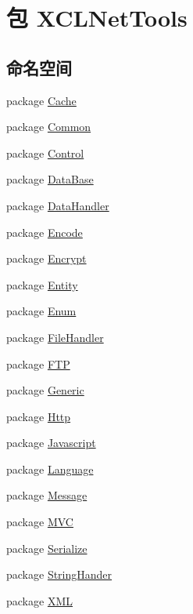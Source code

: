 \hypertarget{namespace_x_c_l_net_tools}{\section{包 X\-C\-L\-Net\-Tools}
\label{namespace_x_c_l_net_tools}
}
\subsection*{命名空间}
\begin{DoxyCompactItemize}
\item 
package \hyperlink{namespace_x_c_l_net_tools_1_1_cache}{Cache}
\item 
package \hyperlink{namespace_x_c_l_net_tools_1_1_common}{Common}
\item 
package \hyperlink{namespace_x_c_l_net_tools_1_1_control}{Control}
\item 
package \hyperlink{namespace_x_c_l_net_tools_1_1_data_base}{Data\-Base}
\item 
package \hyperlink{namespace_x_c_l_net_tools_1_1_data_handler}{Data\-Handler}
\item 
package \hyperlink{namespace_x_c_l_net_tools_1_1_encode}{Encode}
\item 
package \hyperlink{namespace_x_c_l_net_tools_1_1_encrypt}{Encrypt}
\item 
package \hyperlink{namespace_x_c_l_net_tools_1_1_entity}{Entity}
\item 
package \hyperlink{namespace_x_c_l_net_tools_1_1_enum}{Enum}
\item 
package \hyperlink{namespace_x_c_l_net_tools_1_1_file_handler}{File\-Handler}
\item 
package \hyperlink{namespace_x_c_l_net_tools_1_1_f_t_p}{F\-T\-P}
\item 
package \hyperlink{namespace_x_c_l_net_tools_1_1_generic}{Generic}
\item 
package \hyperlink{namespace_x_c_l_net_tools_1_1_http}{Http}
\item 
package \hyperlink{namespace_x_c_l_net_tools_1_1_javascript}{Javascript}
\item 
package \hyperlink{namespace_x_c_l_net_tools_1_1_language}{Language}
\item 
package \hyperlink{namespace_x_c_l_net_tools_1_1_message}{Message}
\item 
package \hyperlink{namespace_x_c_l_net_tools_1_1_m_v_c}{M\-V\-C}
\item 
package \hyperlink{namespace_x_c_l_net_tools_1_1_serialize}{Serialize}
\item 
package \hyperlink{namespace_x_c_l_net_tools_1_1_string_hander}{String\-Hander}
\item 
package \hyperlink{namespace_x_c_l_net_tools_1_1_x_m_l}{X\-M\-L}
\end{DoxyCompactItemize}
